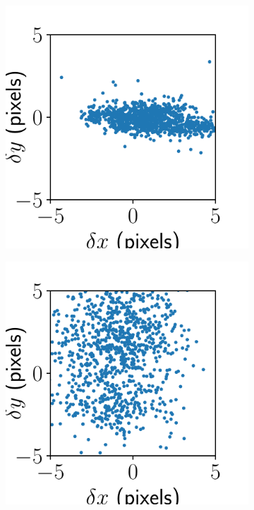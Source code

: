 \documentclass{article}
\begin{document}
\begin{figure}[ht]
	\centering
	\begin{subfigure}{0.24\linewidth}
		\includegraphics[width=\linewidth]{alignment-result-vectra-big-4.pdf}
		\caption{}
		\label{fig:alignmentresultbig4}
	\end{subfigure}
	\begin{subfigure}{0.24\linewidth}
		\includegraphics[width=\linewidth]{alignment-result-vectra-big-3.pdf}

\end{subfigure}
\end{figure}
\end{document}

